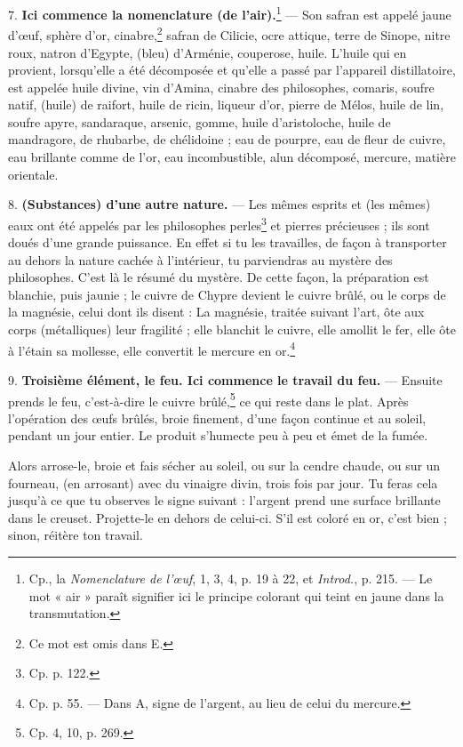 \documentclass[a4paper, 11pt, oneside, polutonikogreek, french]{article}
\begin{document}
7. \textbf{Ici commence la nomenclature (de l'air).}\footnote{Cp., la \emph{Nomenclature de l'œuf}, 1, 3, 4, p. 19 à 22, et \emph{Introd.}, p. 215. --- Le mot « air » paraît signifier ici le principe colorant qui teint en jaune dans la transmutation.} --- Son safran est appelé jaune d'œuf, sphère d'or, cinabre,\footnote{Ce mot est omis dans E.} safran de Cilicie, ocre attique, terre de Sinope, nitre roux, natron d'Egypte, (bleu) d'Arménie, couperose, huile. L'huile qui en provient, lorsqu'elle a été décomposée et qu'elle a passé par l'appareil distillatoire, est appelée huile divine, vin d'Amina, cinabre des philosophes, comaris, soufre natif, (huile) de raifort, huile de ricin, liqueur d'or, pierre de Mélos, huile de lin, soufre apyre, sandaraque, arsenic, gomme, huile d'aristoloche, huile de mandragore, de rhubarbe, de chélidoine ; eau de pourpre, eau de fleur de cuivre, eau brillante comme de l'or, eau incombustible, alun décomposé, mercure, matière orientale.

8. \textbf{(Substances) d'une autre nature.} --- Les mêmes esprits et (les mêmes) eaux ont été appelés par les philosophes perles\footnote{Cp. p. 122.} et pierres précieuses ; ils sont doués d'une grande puissance. En effet si tu les travailles, de façon à transporter au dehors la nature cachée à l'intérieur, tu parviendras au mystère des philosophes. C'est là le résumé du mystère. De cette façon, la préparation est blanchie, puis jaunie ; le cuivre de Chypre devient le cuivre brûlé, ou le corps de la magnésie, celui dont ils disent : La magnésie, traitée suivant l'art, ôte aux corps (métalliques) leur fragilité ; elle blanchit le cuivre, elle amollit le fer, elle ôte à l'étain sa mollesse, elle convertit le mercure en or.\footnote{Cp. p. 55. --- Dans A, signe de l'argent, au lieu de celui du mercure.}

9. \textbf{Troisième élément, le feu. Ici commence le travail du feu.} --- Ensuite prends le feu, c'est-à-dire le cuivre brûlé,\footnote{Cp. 4, 10, p. 269.} ce qui reste dans le plat. Après l'opération des œufs brûlés, broie finement, d'une façon continue et au soleil, pendant un jour entier. Le produit s'humecte peu à peu et émet de la fumée.

Alors arrose-le, broie et fais sécher au soleil, ou sur la cendre chaude, ou sur un fourneau, (en arrosant) avec du vinaigre divin, trois fois par jour. Tu feras cela jusqu'à ce que tu observes le signe suivant : l'argent prend une surface brillante dans le creuset. Projette-le en dehors de celui-ci. S'il est coloré en or, c'est bien ; sinon, réitère ton travail.
\end{document}
